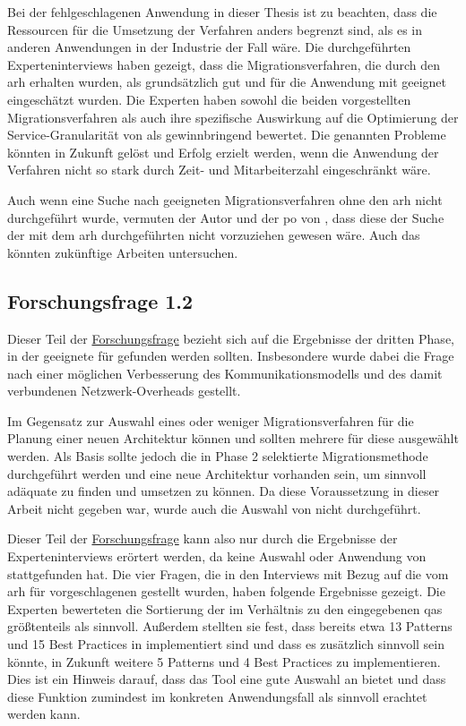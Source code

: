 Bei der fehlgeschlagenen Anwendung in dieser Thesis ist zu beachten, dass die Ressourcen für die Umsetzung der Verfahren anders begrenzt sind, als es in anderen Anwendungen in der Industrie der Fall wäre.
Die durchgeführten Experteninterviews haben gezeigt, dass die Migrationsverfahren, die durch den \gls{arh} erhalten wurden, als grundsätzlich gut und für die Anwendung mit \jf geeignet eingeschätzt wurden.
Die Experten haben sowohl die beiden vorgestellten Migrationsverfahren als auch ihre spezifische Auswirkung auf die Optimierung der Service-Granularität von \jf als gewinnbringend bewertet.
Die genannten Probleme könnten in Zukunft gelöst und Erfolg erzielt werden, wenn die Anwendung der Verfahren nicht so stark durch Zeit- und Mitarbeiterzahl eingeschränkt wäre.

Auch wenn eine Suche nach geeigneten Migrationsverfahren ohne den \gls{arh} nicht durchgeführt wurde, vermuten der Autor und der \gls{po} von \jf, dass diese der Suche der mit dem \gls{arh} durchgeführten nicht vorzuziehen gewesen wäre.
Auch das könnten zukünftige Arbeiten untersuchen.

\subsection{Forschungsfrage 1.2}

Dieser Teil der \hyperref[forschungsfrage:1]{Forschungsfrage} bezieht sich auf die Ergebnisse der dritten Phase, in der geeignete \bpp für \jf gefunden werden sollten.
Insbesondere wurde dabei die Frage nach einer möglichen Verbesserung des Kommunikationsmodells und des damit verbundenen Netzwerk-Overheads gestellt.

Im Gegensatz zur Auswahl eines oder weniger Migrationsverfahren für die Planung einer neuen Architektur können und sollten mehrere \bpp für diese ausgewählt werden.
Als Basis sollte jedoch die in Phase 2 selektierte Migrationsmethode durchgeführt werden und eine neue Architektur vorhanden sein, um sinnvoll adäquate \bpp zu finden und umsetzen zu können.
Da diese Voraussetzung in dieser Arbeit nicht gegeben war, wurde auch die Auswahl von \bpp nicht durchgeführt.

Dieser Teil der  \hyperref[forschungsfrage:1]{Forschungsfrage} kann also nur durch die Ergebnisse der Experteninterviews erörtert werden, da keine Auswahl oder Anwendung von \bpp stattgefunden hat.
Die vier Fragen, die in den Interviews mit Bezug auf die vom \gls{arh} für \jf vorgeschlagenen \bpp gestellt wurden, haben folgende Ergebnisse gezeigt.
Die Experten bewerteten die Sortierung der \bpp im Verhältnis zu den eingegebenen \glspl{qa} größtenteils als sinnvoll.
Außerdem stellten sie fest, dass bereits etwa 13 Patterns und 15 Best Practices in \jf implementiert sind und dass es zusätzlich sinnvoll sein könnte, in Zukunft weitere 5 Patterns und 4 Best Practices zu implementieren.
Dies ist ein Hinweis darauf, dass das Tool eine gute Auswahl an \bpp bietet und dass diese Funktion zumindest im konkreten Anwendungsfall als sinnvoll erachtet werden kann.

